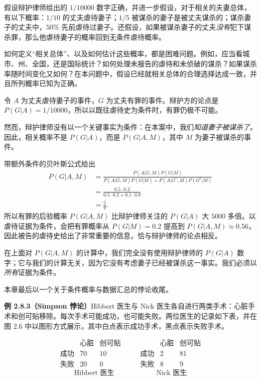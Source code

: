 \documentclass[UTF8, 12pt, fontset=fandol, oneside]{ctexart}
\begin{document}
假设辩护律师给出的 $1/10000$ 数字正确，并进一步假设，对于相关的夫妻总体，有以下概率：$1/10$ 的丈夫虐待妻子；$1/5$ 被谋杀的妻子是被丈夫谋杀的；谋杀妻子的丈夫中，$50\%$ 先前虐待过妻子。还假设，如果被谋杀妻子的丈夫\textit{没有}犯下谋杀罪，那么他虐待妻子的概率回到无条件虐待概率。

如何定义“相关总体”、以及如何估计这些概率，都是困难问题。例如，应当看城市、州、全国，还是国际统计？如何处理未报告的虐待和未侦破的谋杀？如果谋杀率随时间变化又如何？在本问题中，假设已经就相关总体的合理选择达成一致，并且所列概率已知为正确。

令 $A$ 为丈夫虐待妻子的事件，$G$ 为丈夫有罪的事件。辩护方的论点是 $P(G|A)=1/10000$，所以以既往虐待史为条件时，有罪仍极不可能。

然而，辩护律师没有以一个关键事实为条件：在本案中，我们\textit{知道妻子被谋杀了}。因此，相关概率不是 $P(G|A)$，而是 $P(G|A,M)$，其中 $M$ 为妻子被谋杀的事件。

带额外条件的贝叶斯公式给出
\[
\begin{aligned}
  P(G|A,M)
  &=
  \frac{P(A|G,M)P(G|M)}
       {P(A|G,M)P(G|M)+P(A|G^c,M)P(G^c|M)}\\
  &=
  \frac{0.5\cdot 0.2}{0.5\cdot 0.2+0.1\cdot 0.8}\\
  &=
  \frac59.
\end{aligned}
\]
所以有罪的后验概率 $P(G|A,M)$ 比辩护律师关注的 $P(G|A)$ 大 $5000$ 多倍。以虐待证据为条件，会把有罪概率从 $P(G|M)=0.2$ 提高到 $P(G|A,M)\approx 0.56$，因此被告的虐待史给出了非常重要的信息，恰与辩护律师的论点相反。

在上面对 $P(G|A,M)$ 的计算中，我们完全没有使用辩护律师的 $P(G|A)$ 数字；它与我们的计算无关，因为它没有考虑妻子已经被谋杀这一事实。我们必须以\textit{所有}证据为条件。

本章最后以一个关于条件概率与数据汇总的悖论收尾。

\noindent\textbf{例 2.8.3（Simpson 悖论）}\quad Hibbert 医生与 Nick 医生各自进行两类手术：心脏手术和创可贴移除。每次手术可能成功，也可能失败。两位医生的记录如下表，并在图 2.6 中以图形方式展示，其中白点表示成功手术，黑点表示失败手术。

\[
\begin{array}{c|cc}
 & \text{心脏} & \text{创可贴}\\
\hline
\text{成功} & 70 & 10\\
\text{失败} & 20 & 0
\end{array}
\qquad
\begin{array}{c|cc}
 & \text{心脏} & \text{创可贴}\\
\hline
\text{成功} & 2 & 81\\
\text{失败} & 8 & 9
\end{array}
\]
\[
  \text{Hibbert 医生}
  \qquad\qquad\qquad
  \text{Nick 医生}
\]
\end{document}
